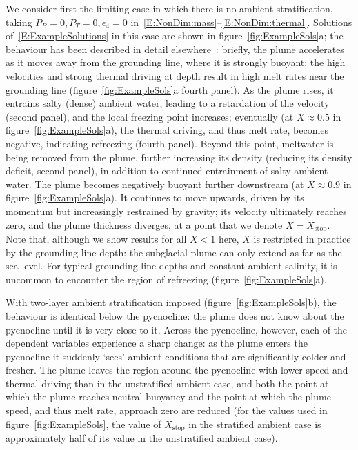 \documentclass[openacc]{rsproca_new}%
\newcommand{\epsfour}{\epsilon_{4}}
\newcommand{\Pb}{\textit{P}_B}  %
\newcommand{\Pt}{\textit{P}_T}
\begin{document}
We consider first the limiting case in which there is no ambient stratification, taking $\Pb = 0, \Pt = 0, \epsfour = 0$ in~\eqref{E:NonDim:mass}--\eqref{E:NonDim:thermal}. Solutions of~\eqref{E:ExampleSolutions} in this case are shown in figure~\ref{fig:ExampleSols}a; the behaviour has been described in detail elsewhere~\citep[see][for example]{Jenkins1991JGeophysResOceans, Jenkins2011JPhysOcean, Magorrian2016JGeoResOcean, Hewitt2020AnnRevFlu}: briefly, the plume accelerates as it moves away from the grounding line, where it is strongly buoyant; the high velocities and strong thermal driving at depth result in high melt rates near the grounding line (figure~\ref{fig:ExampleSols}a fourth panel). As the plume rises, it entrains salty (dense) ambient water, leading to a retardation of the velocity (second panel), and the local freezing point increases; eventually (at $X \approx 0.5$ in figure~\ref{fig:ExampleSols}a), the thermal driving, and thus melt rate, becomes negative, indicating refreezing (fourth panel). Beyond this point, meltwater is being removed from the plume, further increasing its density (reducing its density deficit, second panel), in addition to continued entrainment of salty ambient water. The plume becomes negatively buoyant further downstream (at $X \approx 0.9$ in figure~\ref{fig:ExampleSols}a). It continues to move upwards, driven by its momentum but increasingly restrained by gravity; its velocity ultimately reaches zero, and the plume thickness diverges, at a point that we denote $X = X_{\text{stop}}$. Note that, although we show results for all $X < 1$ here, $X$ is restricted in practice by the grounding line depth: the subglacial plume can only extend as far as the sea level. For typical grounding line depths and constant ambient salinity, it is uncommon to encounter the region of refreezing (figure~\ref{fig:ExampleSols}a). 

With two-layer ambient stratification imposed (figure~\ref{fig:ExampleSols}b), the behaviour is identical below the pycnocline: the plume does not know about the pycnocline until it is very close to it. Across the pycnocline, however, each of the dependent variables experience a sharp change: as the plume enters the pycnocline it suddenly `sees' ambient conditions that are significantly colder and fresher. The plume leaves the region around the pycnocline with lower speed and thermal driving than in the unstratified ambient case, and both the point at which the plume reaches neutral buoyancy and the point at which the plume speed, and thus melt rate, approach zero are reduced (for the values used in figure~\ref{fig:ExampleSols}, the value of $X_{\text{stop}}$ in the stratified ambient case is approximately half of its value in the unstratified ambient case).
\end{document}
